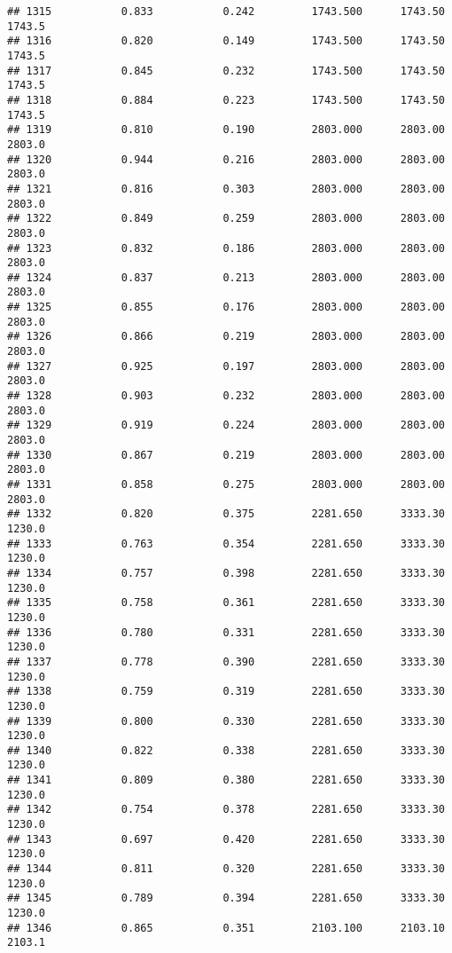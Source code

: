 \documentclass[
]{article}
\begin{document}
\begin{verbatim}
## 1315           0.833           0.242         1743.500      1743.50       1743.5
## 1316           0.820           0.149         1743.500      1743.50       1743.5
## 1317           0.845           0.232         1743.500      1743.50       1743.5
## 1318           0.884           0.223         1743.500      1743.50       1743.5
## 1319           0.810           0.190         2803.000      2803.00       2803.0
## 1320           0.944           0.216         2803.000      2803.00       2803.0
## 1321           0.816           0.303         2803.000      2803.00       2803.0
## 1322           0.849           0.259         2803.000      2803.00       2803.0
## 1323           0.832           0.186         2803.000      2803.00       2803.0
## 1324           0.837           0.213         2803.000      2803.00       2803.0
## 1325           0.855           0.176         2803.000      2803.00       2803.0
## 1326           0.866           0.219         2803.000      2803.00       2803.0
## 1327           0.925           0.197         2803.000      2803.00       2803.0
## 1328           0.903           0.232         2803.000      2803.00       2803.0
## 1329           0.919           0.224         2803.000      2803.00       2803.0
## 1330           0.867           0.219         2803.000      2803.00       2803.0
## 1331           0.858           0.275         2803.000      2803.00       2803.0
## 1332           0.820           0.375         2281.650      3333.30       1230.0
## 1333           0.763           0.354         2281.650      3333.30       1230.0
## 1334           0.757           0.398         2281.650      3333.30       1230.0
## 1335           0.758           0.361         2281.650      3333.30       1230.0
## 1336           0.780           0.331         2281.650      3333.30       1230.0
## 1337           0.778           0.390         2281.650      3333.30       1230.0
## 1338           0.759           0.319         2281.650      3333.30       1230.0
## 1339           0.800           0.330         2281.650      3333.30       1230.0
## 1340           0.822           0.338         2281.650      3333.30       1230.0
## 1341           0.809           0.380         2281.650      3333.30       1230.0
## 1342           0.754           0.378         2281.650      3333.30       1230.0
## 1343           0.697           0.420         2281.650      3333.30       1230.0
## 1344           0.811           0.320         2281.650      3333.30       1230.0
## 1345           0.789           0.394         2281.650      3333.30       1230.0
## 1346           0.865           0.351         2103.100      2103.10       2103.1

\end{verbatim}
\end{document}
